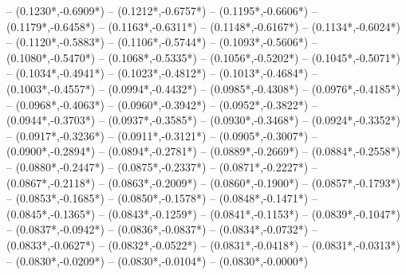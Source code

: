 {	-- ({0.1230*\dx},{-0.6909*\dy})
	-- ({0.1212*\dx},{-0.6757*\dy})
	-- ({0.1195*\dx},{-0.6606*\dy})
	-- ({0.1179*\dx},{-0.6458*\dy})
	-- ({0.1163*\dx},{-0.6311*\dy})
	-- ({0.1148*\dx},{-0.6167*\dy})
	-- ({0.1134*\dx},{-0.6024*\dy})
	-- ({0.1120*\dx},{-0.5883*\dy})
	-- ({0.1106*\dx},{-0.5744*\dy})
	-- ({0.1093*\dx},{-0.5606*\dy})
	-- ({0.1080*\dx},{-0.5470*\dy})
	-- ({0.1068*\dx},{-0.5335*\dy})
	-- ({0.1056*\dx},{-0.5202*\dy})
	-- ({0.1045*\dx},{-0.5071*\dy})
	-- ({0.1034*\dx},{-0.4941*\dy})
	-- ({0.1023*\dx},{-0.4812*\dy})
	-- ({0.1013*\dx},{-0.4684*\dy})
	-- ({0.1003*\dx},{-0.4557*\dy})
	-- ({0.0994*\dx},{-0.4432*\dy})
	-- ({0.0985*\dx},{-0.4308*\dy})
	-- ({0.0976*\dx},{-0.4185*\dy})
	-- ({0.0968*\dx},{-0.4063*\dy})
	-- ({0.0960*\dx},{-0.3942*\dy})
	-- ({0.0952*\dx},{-0.3822*\dy})
	-- ({0.0944*\dx},{-0.3703*\dy})
	-- ({0.0937*\dx},{-0.3585*\dy})
	-- ({0.0930*\dx},{-0.3468*\dy})
	-- ({0.0924*\dx},{-0.3352*\dy})
	-- ({0.0917*\dx},{-0.3236*\dy})
	-- ({0.0911*\dx},{-0.3121*\dy})
	-- ({0.0905*\dx},{-0.3007*\dy})
	-- ({0.0900*\dx},{-0.2894*\dy})
	-- ({0.0894*\dx},{-0.2781*\dy})
	-- ({0.0889*\dx},{-0.2669*\dy})
	-- ({0.0884*\dx},{-0.2558*\dy})
	-- ({0.0880*\dx},{-0.2447*\dy})
	-- ({0.0875*\dx},{-0.2337*\dy})
	-- ({0.0871*\dx},{-0.2227*\dy})
	-- ({0.0867*\dx},{-0.2118*\dy})
	-- ({0.0863*\dx},{-0.2009*\dy})
	-- ({0.0860*\dx},{-0.1900*\dy})
	-- ({0.0857*\dx},{-0.1793*\dy})
	-- ({0.0853*\dx},{-0.1685*\dy})
	-- ({0.0850*\dx},{-0.1578*\dy})
	-- ({0.0848*\dx},{-0.1471*\dy})
	-- ({0.0845*\dx},{-0.1365*\dy})
	-- ({0.0843*\dx},{-0.1259*\dy})
	-- ({0.0841*\dx},{-0.1153*\dy})
	-- ({0.0839*\dx},{-0.1047*\dy})
	-- ({0.0837*\dx},{-0.0942*\dy})
	-- ({0.0836*\dx},{-0.0837*\dy})
	-- ({0.0834*\dx},{-0.0732*\dy})
	-- ({0.0833*\dx},{-0.0627*\dy})
	-- ({0.0832*\dx},{-0.0522*\dy})
	-- ({0.0831*\dx},{-0.0418*\dy})
	-- ({0.0831*\dx},{-0.0313*\dy})
	-- ({0.0830*\dx},{-0.0209*\dy})
	-- ({0.0830*\dx},{-0.0104*\dy})
	-- ({0.0830*\dx},{-0.0000*\dy})
}
